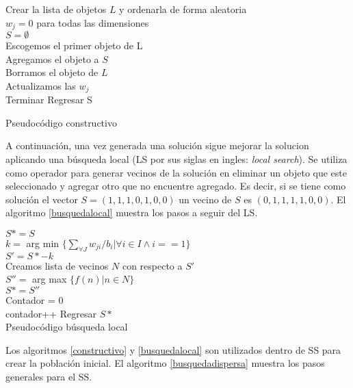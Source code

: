 \documentclass[12pt,a4paper,twocolumn]{article}
\begin{document}
\begin{algorithm}
Crear la lista de objetos $L$ y ordenarla de forma aleatoria\\
$w_j = 0$ para todas las dimensiones\\
$S = \emptyset$ \\
{
	Escogemos el primer objeto de L \\
	{
		Agregamos el objeto a $S$ \\
		Borramos el objeto de $L$\\
		Actualizamos las $w_j$ \\
	}
	{
		Terminar
	}
}
Regresar S
\caption{Pseudocódigo constructivo}
\label{constructivo}
\end{algorithm}

A continuación, una vez generada una solución sigue mejorar la solucion aplicando una búsqueda local (LS por sus siglas en ingles: \emph{local search}). Se utiliza como operador para generar vecinos de la solución en eliminar un objeto que este seleccionado y agregar otro que no encuentre agregado. Es decir, si se tiene como solución el vector $S = (1, 1, 1, 0, 1, 0, 0)$ un vecino de $S$ es $(0, 1, 1, 1, 1, 0, 0)$. El algoritmo \ref{busquedalocal} muestra los pasos a seguir del LS.

\begin{algorithm}
 

$S* = S$ \\
 {
	$k =$ arg min $\{\sum_{\forall J} w_{ji} / b_{i} | \forall i \in I \wedge i == 1\}$ \\
	$S' = S* - k$ \\
	Creamos lista de vecinos $N$ con respecto a $S'$ \\
	$S'' =$ arg max $\{f(n) | n \in N \}$ \\
	 {
		$S* = S''$ \\
		Contador = 0 \\
	}
	contador++
}
Regresar $S*$ \\

\caption{Pseudocódigo búsqueda local}
\label{busquedalocal}
\end{algorithm}

Los algoritmos \ref{constructivo} y \ref{busquedalocal} son utilizados dentro de SS para crear la población inicial. El algoritmo \ref{busquedadispersa} muestra los pasos generales para el SS.
\end{document}
